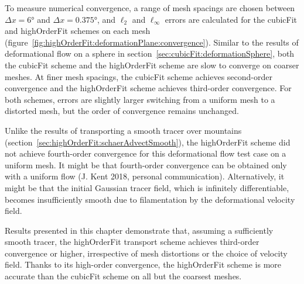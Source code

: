 To measure numerical convergence, a range of mesh spacings are chosen between $\Delta x = \ang{6}$ and $\Delta x = \ang{0.375}$, and $\ell_2$ and $\ell_\infty$ errors are calculated for the cubicFit and highOrderFit schemes on each mesh (figure~\ref{fig:highOrderFit:deformationPlane:convergence}).
Similar to the results of deformational flow on a sphere in section~\ref{sec:cubicFit:deformationSphere}, both the cubicFit scheme and the highOrderFit scheme are slow to converge on coarser meshes.
At finer mesh spacings, the cubicFit scheme achieves second-order convergence and the highOrderFit scheme achieves third-order convergence.
For both schemes, errors are slightly larger switching from a uniform mesh to a distorted mesh, but the order of convergence remains unchanged.

Unlike the results of transporting a smooth tracer over mountains (section~\ref{sec:highOrderFit:schaerAdvectSmooth}), the highOrderFit scheme did not achieve fourth-order convergence for this deformational flow test case on a uniform mesh.
It might be that fourth-order convergence can be obtained only with a uniform flow (J. Kent 2018, personal communication).
Alternatively, it might be that the initial Gaussian tracer field, which is infinitely differentiable, becomes insufficiently smooth due to filamentation by the deformational velocity field.

Results presented in this chapter demonstrate that, assuming a sufficiently smooth tracer, the highOrderFit transport scheme achieves third-order convergence or higher, irrespective of mesh distortions or the choice of velocity field.
Thanks to its high-order convergence, the highOrderFit scheme is more accurate than the cubicFit scheme on all but the coarsest meshes.
